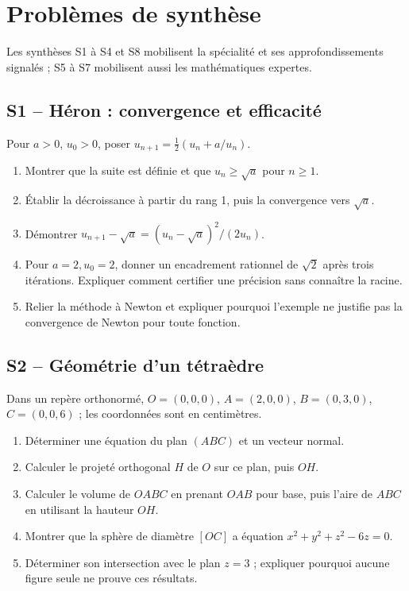 \chapter{Problèmes de synthèse}
Les synthèses S1 à S4 et S8 mobilisent la spécialité et ses approfondissements signalés ; S5 à S7 mobilisent aussi les mathématiques expertes.
\section{S1 -- Héron : convergence et efficacité}
Pour $a>0$, $u_0>0$, poser $u_{n+1}=\tfrac12(u_n+a/u_n)$.
\begin{enumerate}
\item Montrer que la suite est définie et que $u_n\ge\sqrt a$ pour $n\ge1$.
\item Établir la décroissance à partir du rang 1, puis la convergence vers $\sqrt a$.
\item Démontrer $u_{n+1}-\sqrt a=(u_n-\sqrt a)^2/(2u_n)$.
\item Pour $a=2,u_0=2$, donner un encadrement rationnel de $\sqrt2$ après trois itérations. Expliquer comment certifier une précision sans connaître la racine.
\item Relier la méthode à Newton et expliquer pourquoi l'exemple ne justifie pas la convergence de Newton pour toute fonction.
\end{enumerate}

\section{S2 -- Géométrie d’un tétraèdre}
Dans un repère orthonormé, $O=(0,0,0)$, $A=(2,0,0)$, $B=(0,3,0)$, $C=(0,0,6)$ ; les coordonnées sont en centimètres.
\begin{enumerate}
\item Déterminer une équation du plan $(ABC)$ et un vecteur normal.
\item Calculer le projeté orthogonal $H$ de $O$ sur ce plan, puis $OH$.
\item Calculer le volume de $OABC$ en prenant $OAB$ pour base, puis l'aire de $ABC$ en utilisant la hauteur $OH$.
\item Montrer que la sphère de diamètre $[OC]$ a équation $x^2+y^2+z^2-6z=0$.
\item Déterminer son intersection avec le plan $z=3$ ; expliquer pourquoi aucune figure seule ne prouve ces résultats.
\end{enumerate}

